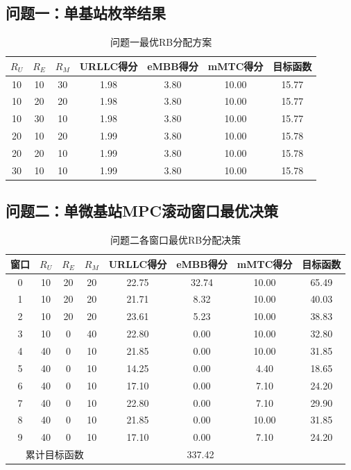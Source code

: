 \documentclass[withoutpreface,bwprint]{cumcmthesis}
\begin{document}
\begin{appendices}
\subsection{问题一：单基站枚举结果}
\begin{table}[H]
\centering
\caption{问题一最优RB分配方案}
\begin{tabular}{|c|c|c|c|c|c|c|}
\hline
$R_U$ & $R_E$ & $R_M$ & URLLC得分 & eMBB得分 & mMTC得分 & 目标函数 \\
\hline
10 & 10 & 30 & 1.98 & 3.80 & 10.00 & 15.77 \\
10 & 20 & 20 & 1.98 & 3.80 & 10.00 & 15.77 \\
10 & 30 & 10 & 1.98 & 3.80 & 10.00 & 15.77 \\
20 & 10 & 20 & 1.99 & 3.80 & 10.00 & 15.78 \\
20 & 20 & 10 & 1.99 & 3.80 & 10.00 & 15.78 \\
30 & 10 & 10 & 1.99 & 3.80 & 10.00 & 15.78 \\
\hline
\end{tabular}
\end{table}

\subsection{问题二：单微基站MPC滚动窗口最优决策}
\begin{table}[H]
\centering
\caption{问题二各窗口最优RB分配决策}
\begin{tabular}{|c|c|c|c|c|c|c|c|}
\hline
窗口 & $R_U$ & $R_E$ & $R_M$ & URLLC得分 & eMBB得分 & mMTC得分 & 目标函数 \\
\hline
0 & 10 & 20 & 20 & 22.75 & 32.74 & 10.00 & 65.49 \\
1 & 10 & 20 & 20 & 21.71 & 8.32 & 10.00 & 40.03 \\
2 & 10 & 20 & 20 & 23.61 & 5.23 & 10.00 & 38.83 \\
3 & 10 & 0 & 40 & 22.80 & 0.00 & 10.00 & 32.80 \\
4 & 40 & 0 & 10 & 21.85 & 0.00 & 10.00 & 31.85 \\
5 & 40 & 0 & 10 & 14.25 & 0.00 & 4.40 & 18.65 \\
6 & 40 & 0 & 10 & 17.10 & 0.00 & 7.10 & 24.20 \\
7 & 40 & 0 & 10 & 22.80 & 0.00 & 7.10 & 29.90 \\
8 & 40 & 0 & 10 & 21.85 & 0.00 & 10.00 & 31.85 \\
9 & 40 & 0 & 10 & 17.10 & 0.00 & 7.10 & 24.20 \\
\hline
\multicolumn{4}{|c|}{累计目标函数} & \multicolumn{3}{c|}{337.42} \\
\hline
\end{tabular}
\end{table}


\end{appendices}
\end{document}
